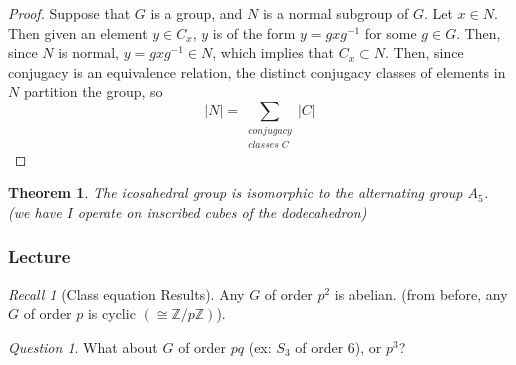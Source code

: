 \documentclass[12pt]{article}
\newtheorem{thm}{Theorem}[section]
\theoremstyle{definition}
\theoremstyle{remark}
\newtheorem*{qst}{Question}
\newtheorem*{rec}{Recall}
\numberwithin{equation}{section}
\newcommand\Z{\mathbb Z}    %
\begin{document}
\begin{proof}
        Suppose that $G$ is a group, and $N$ is a normal subgroup of $G$. Let $x \in N$. Then given an element $y \in C_x$, $y$ is of the form $y = gxg^{-1}$ for some $g \in G$. Then, since $N$ is normal, $y = gxg^{-1} \in N$, which implies that $C_x \subset N$. Then, since conjugacy is an equivalence relation, the distinct conjugacy classes of elements in $N$ partition the group, so \begin{equation}
                |N| = \sum\limits_{\begin{array}{c}conjugacy\\classes\;C\end{array}}|C|
        \end{equation}
\end{proof}


\vspace{15pt}

\begin{thm}
        The icosahedral group is isomorphic to the alternating group $A_5$. (we have $I$ operate on inscribed cubes of the dodecahedron)
\end{thm}

\vspace{15pt}

\subsubsection{Lecture}

\begin{rec}[Class equation Results]
        Any $G$ of order $p^2$ is abelian. (from before, any $G$ of order $p$ is cyclic $(\cong \Z/p\Z)$).
\end{rec}

\vspace{15pt}

\begin{qst}
        What about $G$ of order $pq$ (ex: $S_3$ of order 6), or $p^3$?
\end{qst}

\vspace{15pt}
\end{document}
